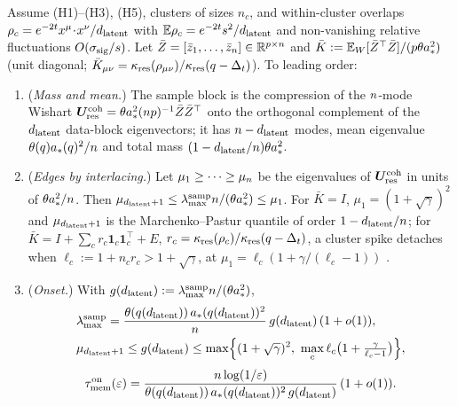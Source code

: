 \begin{proposition}\label{prop:onset-buf}
Assume (H1)--(H3), (H5), clusters of sizes $n_c$, and within-cluster overlaps $\rho_c=e^{-2t}x^\mu\!\cdot\!x^\nu/d_{\mathrm{latent}}$ with $\mathbb{E}\rho_c=e^{-2t}s^2/d_{\mathrm{latent}}$ and non-vanishing relative fluctuations $O(\sigma_{\mathrm{sig}}/s)$. Let $\bar Z=[\bar z_1,\dots,\bar z_{n}]\in\mathbb{R}^{p\times n}$ and $\bar K:=\mathbb{E}_W[\bar Z^\top\bar Z]/(p\theta a_*^2)$ (unit diagonal; $\bar K_{\mu\nu}=\kappa_{\rm res}(\rho_{\mu\nu})/\kappa_{\rm res}(q-\Delta_t)$). To leading order:
\begin{enumerate}
\item[(a)] (\emph{Mass and mean.}) The sample block is the compression of the $n$-mode Wishart $\bm{U}^{\rm coh}_{\rm res}=\theta a_*^2(np)^{-1}\bar Z\bar Z^\top$ onto the orthogonal complement of the $d_{\mathrm{latent}}$ data-block eigenvectors; it has $n-d_{\mathrm{latent}}$ modes, mean eigenvalue $\theta(q)a_*(q)^2/n$ and total mass $(1-d_{\mathrm{latent}}/n)\theta a_*^2$.
\item[(b)] (\emph{Edges by interlacing.}) Let $\mu_1\ge\dots\ge\mu_{n}$ be the eigenvalues of $\bm{U}^{\rm coh}_{\rm res}$ in units of $\theta a_*^2/n$. Then $\mu_{d_{\mathrm{latent}}+1}\le\lambda^{\rm samp}_{\max}n/(\theta a_*^2)\le\mu_1$. For $\bar K=I$, $\mu_1=(1+\sqrt\gamma)^2$ and $\mu_{d_{\mathrm{latent}}+1}$ is the Marchenko--Pastur quantile of order $1-d_{\mathrm{latent}}/n$; for $\bar K=I+\sum_cr_c\mathbf 1_c\mathbf 1_c^\top+E$, $r_c=\kappa_{\rm res}(\rho_c)/\kappa_{\rm res}(q-\Delta_t)$, a cluster spike detaches when $\ell_c:=1+n_cr_c>1+\sqrt\gamma$, at $\mu_1=\ell_c(1+\gamma/(\ell_c-1))$ \citep{baik2005phase}.
\item[(c)] (\emph{Onset.}) With $g(d_{\mathrm{latent}}):=\lambda^{\rm samp}_{\max}n/(\theta a_*^2)$,
\begin{equation}\label{eq:lmax-samp-buf}
\begin{aligned}
&\lambda^{\rm samp}_{\max}=\frac{\theta(q(\dlat))\,a_*(q(\dlat))^2}{\nsamp}\,g(\dlat)\,(1+o(1)),\\ & \mu_{\dlat+1}\le g(\dlat)\le\max\Bigl\{(1+\sqrt\gamma)^2,\ \max_c\ell_c\bigl(1+\tfrac{\gamma}{\ell_c-1}\bigr)\Bigr\},
\end{aligned}
\end{equation}
\begin{equation}
\tau_{\mathrm{mem}}^{\rm on}(\varepsilon)=\frac{n\log(1/\varepsilon)}{\theta(q(d_{\mathrm{latent}}))\,a_*(q(d_{\mathrm{latent}}))^2\,g(d_{\mathrm{latent}})}\,(1+o(1)).
\label{eq:tauon-buf}
\end{equation}

\end{enumerate}
\end{proposition}
